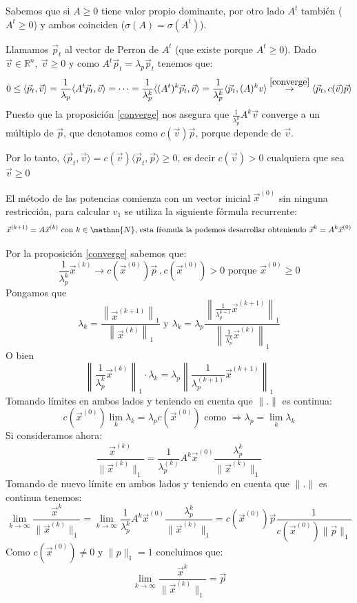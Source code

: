 \documentclass[size=a4, parskip=half, titlepage=false, toc=flat, toc=bib, 12pt]{scrartcl}
\theoremstyle{theorem-style}
\theoremstyle{definition-style}
\theoremstyle{remark-style}
\theoremstyle{example-style}
\theoremstyle{definition-style}
\theoremstyle{remark-style}
\begin{document}
Sabemos que si $A \geq 0$ tiene valor propio dominante, por otro lado $A^t$ también ($A^t \geq 0$) y
ambos coinciden ($\sigma(A) = \sigma(A^t)$).

Llamamos $\vec{p}_t$ al vector de Perron de $A^t$ (que existe porque $A^t \geq 0$). Dado $\vec{v} \in \mathbb{R}^n , \ \vec{v} \geq 0$ y como $A^t \vec{p}_t = \lambda_p \vec{p}_t $ tenemos que:
$$0 \leq \langle \vec{p}_t, \vec{v} \rangle = \frac{1}{\lambda_p} \langle A^t \vec{p}_t, \vec{v} \rangle = \cdots = \frac{1}{\lambda_p^k} \langle (A^t)^k \vec{p}_t , \vec{v} \rangle =  \frac{1}{\lambda_p^k} \langle \vec{p}_t , (A)^k v \rangle \overset{\ref{converge}} \rightarrow \langle \vec{p}_t , c(\vec{v})\vec{p} \rangle$$
Puesto que la proposición \ref{converge} nos asegura que $\frac{1}{\lambda_p^k} A^k \vec{v}$ converge a un múltiplo de $\vec{p}$, que denotamos como $c(\vec{v})\vec{p}$, porque depende de $\vec{v}$.

Por lo tanto, $\langle \vec{p}_t , \vec{v} \rangle = c(\vec{v}) \langle \vec{p}_t , \vec{p} \rangle \geq 0$, es decir $c(\vec{v}) >0$ cualquiera que sea $\vec{v} \geq 0$

El método de las potencias comienza con un vector inicial $\vec{x}^{(0)}$ sin ninguna restricción, para calcular $v_1$ se utiliza la siguiente fórmula recurrente:
$$\vec{x}^{(k+1)} = A \vec{x}^{(k)} \textrm{ con } k \in \mathnn{N} \textrm{, esta fŕomula la podemos desarrollar obteniendo } \vec{x}^k = A^k \vec{x}^{(0)}$$

Por la proposición \ref{converge} sabemos que:
$$\frac{1}{\lambda_p^k} \vec{x}^{(k)} \rightarrow c(\vec{x}^{(0)})\vec{p} \ , c(\vec{x}^{(0)}) > 0 \textrm{ porque } \vec{x}^{(0)} \geq 0$$
Pongamos que
$$\lambda_k = \frac{\left\|\vec{x}^{(k+1)}\right\|_1}{\left\|\vec{x}^{(k)}\right\|_1} \textrm{ y } \lambda_k = \lambda_p \frac{\left\|\frac{1}{\lambda_p^{k+1}} \vec{x}^{(k+1)}\right\|_1}{\left\|\frac{1}{\lambda_p^k} \vec{x}^{(k)}\right\|_1}$$
O bien
$$\left\|\frac{1}{\lambda_p^k} \vec{x}^{(k)} \right\|_1 \cdot \lambda_k  = \lambda_p \left\| \frac{1}{\lambda_p^{(k+1)}} \vec{x}^{(k+1)} \right\|_1$$
Tomando límites en ambos lados y teniendo en cuenta que $\|.\|$ es continua:
$$c(\vec{x}^{(0)}) \lim_{k} \lambda_k = \lambda_p c(\vec{x}^{(0)}) \textrm{ como }  \Rightarrow \lambda_p = \lim_{k} \lambda_k $$
Si consideramos ahora:
$$\frac{\vec{x}^{(k)}}{\|\vec{x}^{(k)}\|_1} = \frac{1}{\lambda_p^{(k)}} A^k \vec{x}^{(0)} \frac{\lambda_p^k}{\|\vec{x}^{(k)}\|_1} $$
Tomando de nuevo límite en ambos lados y teniendo en cuenta que $\|. \|$ es continua tenemos:
$$\lim_{k \to \infty} \frac{\vec{x}^k}{\|\vec{x}^{(k)}\|_1} = \lim_{k \to \infty} \frac{1}{\lambda_p^k} A^k \vec{x}^{(0)} \frac{\lambda_p^k}{\|\vec{x}^{(k)}\|_1} = c(\vec{x}^{(0)}) \vec{p} \frac{1}{c(\vec{x}^{(0)}) \|\vec{p}\|_1} $$
Como $c(\vec{x}^{(0)}) \neq 0$ y $\|p \|_1 = 1$ concluimos que:
$$\lim_{k \to \infty} \frac{\vec{x}^k}{\|\vec{x}^{(k)}\|_1} = \vec{p} $$
\end{document}
